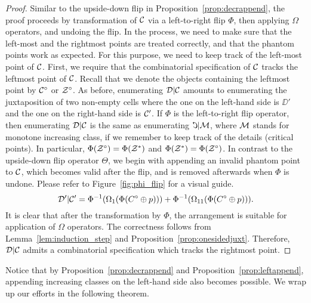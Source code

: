 \documentclass[12pt, a4paper, twoside]{report}
\begin{document}
\begin{proof}
Similar to the upside-down flip in Proposition~\ref{prop:decrappend}, the proof proceeds by transformation of $\mathcal{C}$ via a left-to-right flip $\Phi$, then applying $\Omega$ operators, and undoing the flip. In the process, we need to make sure that the left-most and the rightmost points are treated correctly, and that the phantom points work as expected. For this purpose, we need to keep track of the left-most point of $\mathcal{C}$. First, we require that the combinatorial specification of $\mathcal{C}$ tracks the leftmost point of $\mathcal{C}$. Recall that we denote the objects containing the leftmost point by $\mathcal{C}^\circ$ or $\mathcal{Z}^\circ$. As before, enumerating $\mathcal{D}|\mathcal{C}$ amounts to enumerating the juxtaposition of two non-empty cells where the one on the left-hand side is $\DD'$ and the one on the right-hand side is $\mathcal{C}'$. If $\Phi$ is the left-to-right flip operator, then enumerating $\mathcal{D}|\mathcal{C}$ is the same as enumerating $\reflectbox{\C}|\M$, where $\mathcal{M}$ stands for monotone increasing class, if we remember to keep track of the details (critical points). In particular, $\Phi(\mathcal{Z}^\circ) = \Phi(\mathcal{Z}^*)$ and $\Phi(\mathcal{Z}^*) = \Phi(\mathcal{Z}^\circ)$. In contrast to the upside-down flip operator $\Theta$, we begin with appending an invalid phantom point to $\mathcal{C}$, which becomes valid after the flip, and is removed afterwards when $\Phi$ is undone. Please refer to Figure~\ref{fig:phi_flip} for a visual guide. 
$$\mathcal{D}'|\mathcal{C}' = \Phi^{-1}(\Omega_1(\Phi(C^\circ\oplus p))) + \Phi^{-1}(\Omega_{11}(\Phi(C^\circ\oplus p))).$$
It is clear that after the transformation by $\Phi$, the arrangement is suitable for application of $\Omega$ operators. The correctness follows from Lemma~\ref{lem:induction_step} and Proposition~\ref{prop:onesidedjuxt}. Therefore, $\mathcal{D}|\mathcal{C}$ admits a combinatorial specification which tracks the rightmost point.
\end{proof}
Notice that by Proposition~\ref{prop:decrappend} and Proposition~\ref{prop:leftappend}, appending increasing classes on the left-hand side also becomes possible. We wrap up our efforts in the following theorem.
\end{document}
